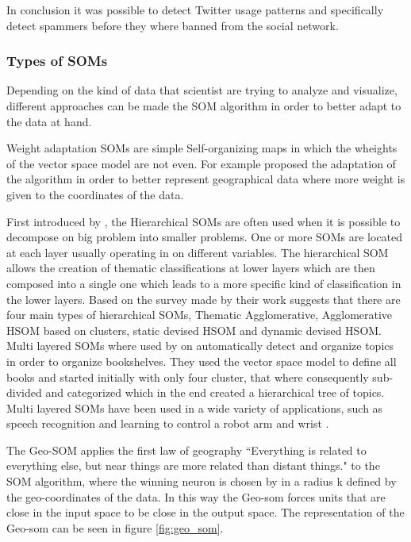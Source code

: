 In conclusion it was possible to detect Twitter usage patterns and specifically detect spammers before they where banned from the social network. 

\subsubsection{Types of SOMs} %
\label{ssub:types_of_soms}

Depending on the kind of data that scientist are trying to analyze and visualize, different approaches can be made the SOM algorithm in order to better adapt to the data at hand.

Weight adaptation SOMs are simple Self-organizing maps in which the wheights of the vector space model are not even. For example \citet{Bacao2005}  proposed the adaptation of the algorithm in order to better represent geographical data where more weight is given to the coordinates of the data.

First introduced by \citet{multi_layer_semantics}, the Hierarchical SOMs are often used when it is possible to decompose on big problem into smaller problems. One or more SOMs are located at each layer usually operating in on different variables. The hierarchical SOM allows the creation of thematic classifications at lower layers which are then composed into a single one \citet{Bacao2005} which leads to a more specific kind of classification in the lower layers. 
Based on the survey made by their work \citet{Henriques2012} suggests that there are four main types of hierarchical SOMs, Thematic Agglomerative, Agglomerative HSOM based on clusters, static devised HSOM and dynamic devised HSOM.
Multi layered SOMs where used by \citet{Rauber2000} on automatically detect and organize topics in order to organize bookshelves. They used the vector space model to define all books and started initially with only four cluster, that where consequently sub-divided and categorized which in the end created a hierarchical tree of topics.
Multi layered SOMs have been used in a wide variety of applications, such as speech recognition \citet{multi_layer_semantics} and learning to control a robot arm and wrist \citet{Sayers1991}.


The Geo-SOM \citet{Bacao2005} applies the first law of geography “Everything is related to everything else, but near things are more related than distant things." to the SOM algorithm, where the winning neuron is chosen by in a radius k defined by the geo-coordinates of the data. In this way the Geo-som forces units that are close in the input space to be close in the output space. The representation of the Geo-som can be seen in figure \ref{fig:geo_som}.



